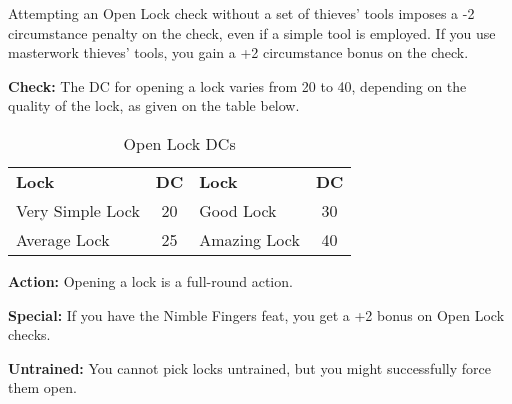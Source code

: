 
Attempting an Open Lock check without a set of thieves' tools imposes a -2 circumstance 
penalty on the check, even if a simple tool is employed. If you use masterwork 
thieves' tools, you gain a +2 circumstance bonus on the check.

\textbf{Check:} The DC for opening a lock varies from 20 to 40, depending on the 
quality of the lock, as given on the table below.

\begin{table}[htb]
\caption{Open Lock DCs}
\centering
\begin{tabular}{l c l c}
\textbf{Lock} & \textbf{DC} & \textbf{Lock} & \textbf{DC}\\
Very Simple Lock & 20 & Good Lock & 30\\
Average Lock & 25 & Amazing Lock & 40\\
\end{tabular}
\end{table}

\textbf{Action:} Opening a lock is a full-round action.

\textbf{Special:} If you have the Nimble Fingers feat, you get a +2 bonus on Open 
Lock checks.

\textbf{Untrained:} You cannot pick locks untrained, but you might successfully 
force them open.
